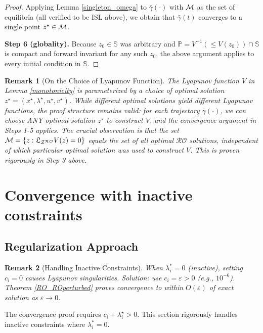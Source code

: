 \documentclass[journal,twoside,web]{ieeecolor}
\newcommand{\rev}[1]{\textcolor{revisionblue}{#1}}
\newcommand{\purpletext}[1]{\textcolor{proofpurple}{#1}}
\newtheorem{remark}{Remark}
\begin{document}
\begin{proof}
{\purpletext{Applying Lemma \ref{singleton_omega} to $\bar\gamma(\cdot)$ with ${\cal M}$ as the set of equilibria (all verified to be ISL above), we obtain that $\bar\gamma(t)$ converges to a single point $z^\star\in{\cal M}$.}
}

\medskip
\rev{\textbf{Step 6 (globality).}
Because $z_0\in\mathbb S$ was arbitrary and $\mathbb P=V^{-1}(\le V(z_0))\cap\mathbb S$ is compact and forward invariant for any such $z_0$, the above argument applies to every initial condition in $\mathbb S$.}
\end{proof}

\begin{remark}[\purpletext{On the Choice of Lyapunov Function}]
\purpletext{The Lyapunov function $V$ in Lemma \ref{monotonicity} is parameterized by a choice of optimal solution $z^\star = (x^\star, \lambda^\star, u^\star, v^\star)$. While different optimal solutions yield different Lyapunov functions, the proof structure remains valid: for each trajectory $\bar{\gamma}(\cdot)$, we can choose ANY optimal solution $z^\star$ to construct $V$, and the convergence argument in Steps 1-5 applies. The crucial observation is that the set ${\cal M} = \{z : \mathfrak{L}_{{\cal Z}^{\cal RO}}V(z) = 0\}$ equals the set of all optimal $\mathcal{RO}$ solutions, independent of which particular optimal solution was used to construct $V$. This is proven rigorously in Step 3 above.}
\end{remark}


\section{Convergence with inactive constraints} \label{perturbed_section_pddynamics}

\subsection*{\rev{Regularization Approach}}

\begin{remark}[\rev{Handling Inactive Constraints}]
\rev{When $\lambda_i^* = 0$ (inactive), setting $c_i = 0$ causes Lyapunov singularities. Solution: use $c_i = \varepsilon > 0$ (e.g., $10^{-6}$). Theorem \ref{RO_ROperturbed} proves convergence to within $O(\varepsilon)$ of exact solution as $\varepsilon \to 0$.}
\end{remark}

The convergence proof requires $c_i+\lambda_i^\star>0$. This section rigorously handles inactive constraints where $\lambda_i^* = 0$.
\end{document}

